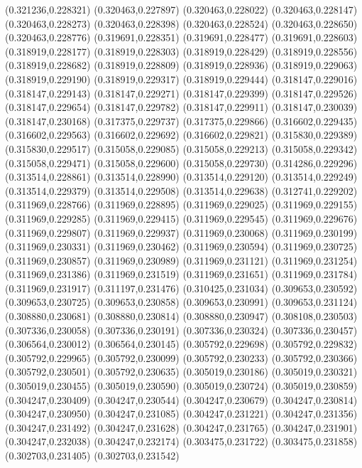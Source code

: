 (0.321236,0.228321)
(0.320463,0.227897)
(0.320463,0.228022)
(0.320463,0.228147)
(0.320463,0.228273)
(0.320463,0.228398)
(0.320463,0.228524)
(0.320463,0.228650)
(0.320463,0.228776)
(0.319691,0.228351)
(0.319691,0.228477)
(0.319691,0.228603)
(0.318919,0.228177)
(0.318919,0.228303)
(0.318919,0.228429)
(0.318919,0.228556)
(0.318919,0.228682)
(0.318919,0.228809)
(0.318919,0.228936)
(0.318919,0.229063)
(0.318919,0.229190)
(0.318919,0.229317)
(0.318919,0.229444)
(0.318147,0.229016)
(0.318147,0.229143)
(0.318147,0.229271)
(0.318147,0.229399)
(0.318147,0.229526)
(0.318147,0.229654)
(0.318147,0.229782)
(0.318147,0.229911)
(0.318147,0.230039)
(0.318147,0.230168)
(0.317375,0.229737)
(0.317375,0.229866)
(0.316602,0.229435)
(0.316602,0.229563)
(0.316602,0.229692)
(0.316602,0.229821)
(0.315830,0.229389)
(0.315830,0.229517)
(0.315058,0.229085)
(0.315058,0.229213)
(0.315058,0.229342)
(0.315058,0.229471)
(0.315058,0.229600)
(0.315058,0.229730)
(0.314286,0.229296)
(0.313514,0.228861)
(0.313514,0.228990)
(0.313514,0.229120)
(0.313514,0.229249)
(0.313514,0.229379)
(0.313514,0.229508)
(0.313514,0.229638)
(0.312741,0.229202)
(0.311969,0.228766)
(0.311969,0.228895)
(0.311969,0.229025)
(0.311969,0.229155)
(0.311969,0.229285)
(0.311969,0.229415)
(0.311969,0.229545)
(0.311969,0.229676)
(0.311969,0.229807)
(0.311969,0.229937)
(0.311969,0.230068)
(0.311969,0.230199)
(0.311969,0.230331)
(0.311969,0.230462)
(0.311969,0.230594)
(0.311969,0.230725)
(0.311969,0.230857)
(0.311969,0.230989)
(0.311969,0.231121)
(0.311969,0.231254)
(0.311969,0.231386)
(0.311969,0.231519)
(0.311969,0.231651)
(0.311969,0.231784)
(0.311969,0.231917)
(0.311197,0.231476)
(0.310425,0.231034)
(0.309653,0.230592)
(0.309653,0.230725)
(0.309653,0.230858)
(0.309653,0.230991)
(0.309653,0.231124)
(0.308880,0.230681)
(0.308880,0.230814)
(0.308880,0.230947)
(0.308108,0.230503)
(0.307336,0.230058)
(0.307336,0.230191)
(0.307336,0.230324)
(0.307336,0.230457)
(0.306564,0.230012)
(0.306564,0.230145)
(0.305792,0.229698)
(0.305792,0.229832)
(0.305792,0.229965)
(0.305792,0.230099)
(0.305792,0.230233)
(0.305792,0.230366)
(0.305792,0.230501)
(0.305792,0.230635)
(0.305019,0.230186)
(0.305019,0.230321)
(0.305019,0.230455)
(0.305019,0.230590)
(0.305019,0.230724)
(0.305019,0.230859)
(0.304247,0.230409)
(0.304247,0.230544)
(0.304247,0.230679)
(0.304247,0.230814)
(0.304247,0.230950)
(0.304247,0.231085)
(0.304247,0.231221)
(0.304247,0.231356)
(0.304247,0.231492)
(0.304247,0.231628)
(0.304247,0.231765)
(0.304247,0.231901)
(0.304247,0.232038)
(0.304247,0.232174)
(0.303475,0.231722)
(0.303475,0.231858)
(0.302703,0.231405)
(0.302703,0.231542)

